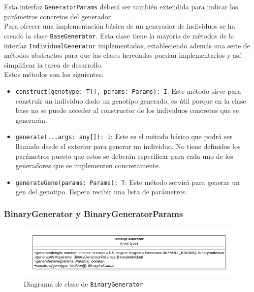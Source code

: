 Esta interfaz \texttt{GeneratorParams} deberá ser también extendida para indicar los parámetros concretos del generador. \\

Para ofrecer una implementación básica de un generador de individuos se ha creado la clase \texttt{BaseGenerator}. Esta clase tiene la mayoría de métodos de la interfaz \texttt{IndividualGenerator} implementados, estableciendo además una serie de métodos abstractos para que las clases heredadas puedan implementarlos y así simplificar la tarea de desarrollo. \\

Estos métodos son los siguientes:

\begin{itemize}
    \item \texttt{construct(genotype: T[], params: Params): I}: Este método sirve para construir un individuo dado un genotipo generado, es útil porque en la clase base no se puede acceder al constructor de los individuos concretos que se generarán.
    \item \texttt{generate(...args: any[]): I}: Este es el método básico que podrá ser llamado desde el exterior para generar un individuo. No tiene definidos los parámetros puesto que estos se deberán especificar para cada uno de los generadores que se implementen concretamente.
    \item \texttt{generateGene(params: Params): T}: Este método servirá para generar un gen del genotipo. Espera recibir una lista de parámetros.
\end{itemize}

\subsubsection{BinaryGenerator y BinaryGeneratorParams}

\begin{figure}[ht]
    \centering
    \includegraphics[scale=0.5]{mem/images/cap-4/4.2.3(Generador)/BinaryGenerator.png}
    \caption{Diagrama de clase de \texttt{BinaryGenerator}}
    \label{fig:generator-uml}
\end{figure}

